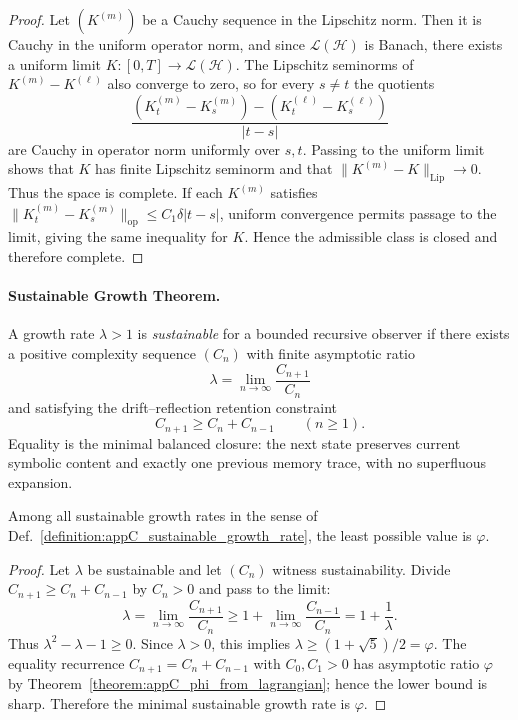 \begin{proof}
\label{proof:appC_banach_space_of_curvature_flows}
Let $(K^{(m)})$ be a Cauchy sequence in the Lipschitz norm. Then it is Cauchy in
the uniform operator norm, and since $\mathcal{L}(\mathcal{H})$ is Banach, there
exists a uniform limit $K:[0,T]\to\mathcal{L}(\mathcal{H})$. The Lipschitz
seminorms of $K^{(m)}-K^{(\ell)}$ also converge to zero, so for every $s\ne t$
the quotients
\[
\frac{(K^{(m)}_t-K^{(m)}_s)-(K^{(\ell)}_t-K^{(\ell)}_s)}{|t-s|}
\]
are Cauchy in operator norm uniformly over $s,t$. Passing to the uniform limit
shows that $K$ has finite Lipschitz seminorm and that
$\|K^{(m)}-K\|_{\operatorname{Lip}}\to0$. Thus the space is complete.
If each $K^{(m)}$ satisfies
$\|K^{(m)}_t-K^{(m)}_s\|_{\mathrm{op}}\le C_1\delta |t-s|$, uniform convergence
permits passage to the limit, giving the same inequality for $K$. Hence the
admissible class is closed and therefore complete.
\end{proof}

\paragraph{Sustainable Growth Theorem.}
\label{paragraph:appC_main_theorem_phi_as_mimiimal_growth_rate}

\begin{definition}
\label{definition:appC_sustainable_growth_rate}
A growth rate $\lambda>1$ is \emph{sustainable} for a bounded recursive observer if
there exists a positive complexity sequence $(C_n)$ with finite asymptotic ratio
\[
\lambda=\lim_{n\to\infty}\frac{C_{n+1}}{C_n}
\]
and satisfying the drift--reflection retention constraint
\[
C_{n+1}\ge C_n+C_{n-1}\qquad(n\ge1).
\]
Equality is the minimal balanced closure: the next state preserves current
symbolic content and exactly one previous memory trace, with no superfluous
expansion.
\end{definition}

\begin{theorem}
\label{theorem:appC_phi_min_growth}
Among all sustainable growth rates in the sense of
Def.~\ref{definition:appC_sustainable_growth_rate}, the least possible value is
$\varphi$.
\end{theorem}

\begin{proof}
\label{proof:appC_phi_min_growth}
Let $\lambda$ be sustainable and let $(C_n)$ witness sustainability. Divide
$C_{n+1}\ge C_n+C_{n-1}$ by $C_n>0$ and pass to the limit:
\[
\lambda=\lim_{n\to\infty}\frac{C_{n+1}}{C_n}
\ge 1+\lim_{n\to\infty}\frac{C_{n-1}}{C_n}
=1+\frac{1}{\lambda}.
\]
Thus $\lambda^2-\lambda-1\ge0$. Since $\lambda>0$, this implies
$\lambda\ge(1+\sqrt5)/2=\varphi$. The equality recurrence
$C_{n+1}=C_n+C_{n-1}$ with $C_0,C_1>0$ has asymptotic ratio $\varphi$ by
Theorem~\ref{theorem:appC_phi_from_lagrangian}; hence the lower bound is sharp.
Therefore the minimal sustainable growth rate is $\varphi$.
\end{proof}

